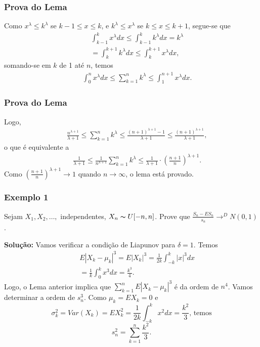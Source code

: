 \begin{frame}
\frametitle{\textbf{Prova do Lema}}
\baselineskip=13pt
\begin{block}{}


Como $x^{\lambda}\leq k^{\lambda}$ se $k-1\leq x\leq k$, e $k^{\lambda}\leq x^{\lambda}$ se $k\leq x\leq k+1$, segue-se que
\begin{eqnarray}
& & \int_{k-1}^{k}x^{\lambda}dx\leq \int_{k-1}^{k}k^{\lambda}dx=k^{\lambda}\nonumber\\
& & =\int_{k}^{k+1}k^{\lambda}dx\leq \int_{k}^{k+1}x^{\lambda}dx,\nonumber
\end{eqnarray}
somando-se em $k$ de 1 até $n$, temos
\begin{eqnarray}
& & \int_{0}^{n}x^{\lambda}dx\leq \sum_{k=1}^{n}k^{\lambda}\leq \int_{1}^{n+1}x^{\lambda}dx.\nonumber
\end{eqnarray}

\end{block}
\end{frame}

\begin{frame}
\frametitle{\textbf{Prova do Lema}}
\baselineskip=13pt
\begin{block}{}

Logo,
\begin{eqnarray}
& & \frac{n^{\lambda+1}}{\lambda+1}\leq \sum_{k=1}^{n}k^{\lambda}\leq \frac{(n+1)^{\lambda+1}-1}{\lambda+1}\leq \frac{(n+1)^{\lambda+1}}{\lambda+1},\nonumber
\end{eqnarray}
o que é equivalente a
\begin{eqnarray}
& & \frac{1}{\lambda+1}\leq \frac{1}{n^{\lambda+1}}\sum_{k=1}^{n}k^{\lambda}\leq \frac{1}{\lambda+1}\cdot(\frac{n+1}{n})^{\lambda+1}.\nonumber
\end{eqnarray}
Como $(\frac{n+1}{n})^{\lambda+1}\rightarrow 1$ quando $n\rightarrow\infty$, o lema está provado.

\end{block}
\end{frame}

\begin{frame}
\frametitle{\textbf{Exemplo 1}}
\baselineskip=13pt
\begin{block}{}


Sejam $X_1,X_2,\ldots,$ independentes, $X_n\thicksim U[-n,n]$. Prove que $\frac{S_n-ES_n}{s_n}\rightarrow^D N(0,1)$.

{\bf Solução:} Vamos verificar a condição de Liapunov para $\delta=1$. Temos
\begin{eqnarray}
& & E|X_k-\mu_k|^3=E|X_k|^3=\frac{1}{2k}\int_{-k}^{k}|x|^3dx\nonumber\\
& & =\frac{1}{k}\int_{0}^{k}x^3dx=\frac{k^3}{4}.\nonumber
\end{eqnarray}
Logo, o Lema anterior implica que $\sum_{k=1}^{n}E|X_k-\mu_k|^3$ é da ordem de $n^4$. Vamos determinar a ordem de $s_n^3$. Como $\mu_k=EX_k=0$ e
$$\sigma_k^2=Var(X_k)=EX_k^2=\frac{1}{2k}\int_{-k}^{k}x^2dx=\frac{k^2}{3}\mbox{, temos}$$
$$s_n^2=\sum_{k=1}^{n}\frac{k^2}{3}.$$

\end{block}
\end{frame}

